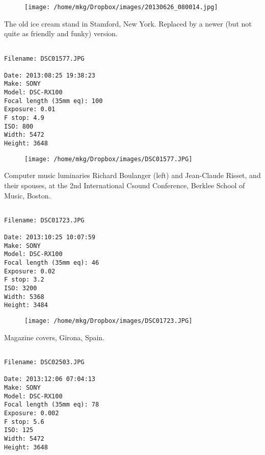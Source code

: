 \begin{figure}
\texttt{[image: /home/mkg/Dropbox/images/20130626\_080014.jpg]}
\end{figure}
    
\clearpage
\onecolumn
\noindent The old ice cream stand in Stamford, New York. Replaced by a newer (but not quite as friendly and funky) version.
\noindent
\begin{lstlisting}

Filename: DSC01577.JPG

Date: 2013:08:25 19:38:23
Make: SONY
Model: DSC-RX100
Focal length (35mm eq): 100
Exposure: 0.01
F stop: 4.9
ISO: 800
Width: 5472
Height: 3648
\end{lstlisting}
\clearpage

\begin{figure}
\texttt{[image: /home/mkg/Dropbox/images/DSC01577.JPG]}
\end{figure}
    
\clearpage
\onecolumn
\noindent Computer music luminaries Richard Boulanger (left) and Jean-Claude Risset, and their spouses, at the 2nd International Csound Conference, Berklee School of Music, Boston.
\noindent
\begin{lstlisting}

Filename: DSC01723.JPG

Date: 2013:10:25 10:07:59
Make: SONY
Model: DSC-RX100
Focal length (35mm eq): 46
Exposure: 0.02
F stop: 3.2
ISO: 3200
Width: 5368
Height: 3484
\end{lstlisting}
\clearpage

\begin{figure}
\texttt{[image: /home/mkg/Dropbox/images/DSC01723.JPG]}
\end{figure}
    
\clearpage
\onecolumn
\noindent Magazine covers, Girona, Spain.
\noindent
\begin{lstlisting}

Filename: DSC02503.JPG

Date: 2013:12:06 07:04:13
Make: SONY
Model: DSC-RX100
Focal length (35mm eq): 78
Exposure: 0.002
F stop: 5.6
ISO: 125
Width: 5472
Height: 3648
\end{lstlisting}
\clearpage


